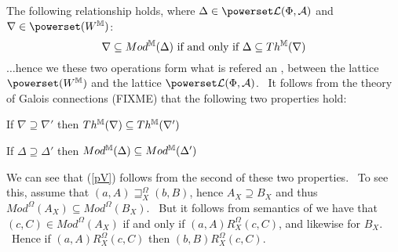 The following relationship holds, where $\Delta \in \powerset  \mathcal{L}
(\Phi, \mathcal{A})$ and $\nabla \in \powerset (W^{\mathbbm{M}})$:
\[ \nabla \subseteq Mod^{\mathbbm{M}} (\Delta) \text{ if and only if }
   \Delta \subseteq Th^{\mathbbm{M}} (\nabla) \]
$\ldots$hence we these two operations form what is refered an
, between the lattice $\powerset
(W^{\mathbbm{M}})$ and the lattice $\powerset \mathcal{L} (\Phi,
\mathcal{A})$. \ It follows from the theory of Galois connections (FIXME) that
the following two properties hold:
\begin{itemizedot}
  \item If $\nabla \supseteq \nabla'$ then $Th^{\mathbbm{M}} (\nabla)
  \subseteq Th^{\mathbbm{M}} (\nabla')$
  
  \item If $\Delta \supseteq \Delta'$ then $Mod^{\mathbbm{M}} (\Delta)
  \subseteq Mod^{\mathbbm{M}} (\Delta')$
\end{itemizedot}
We can see that (\ref{pV}) follows from the second of these two properties. \
To see this, assume that $(a, A) \sqsupseteq_X^{\Omega} (b, B)$, hence $A_X
\supseteq B_X$ and thus $Mod^{\Omega} (A_X) \subseteq
Mod^{\Omega} (B_X)$. \ But it follows from semantics of 
we have that $(c, C) \in Mod^{\Omega} (A_X)$ if and only if $(a, A)
R^{\Omega}_X (c, C)$, and likewise for $B_X$. \ Hence if $(a, A) R^{\Omega}_X
(c, C)$ then $(b, B) R^{\Omega}_X (c, C)$.

% 